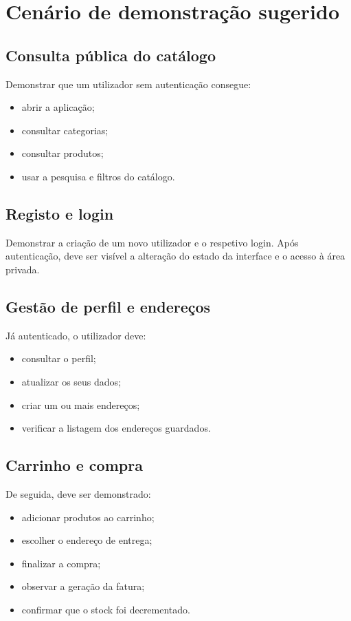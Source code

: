 \documentclass[10pt,a4paper]{report}
\begin{document}
\section{Cenário de demonstração sugerido}

\subsection{Consulta pública do catálogo}

Demonstrar que um utilizador sem autenticação consegue:

\begin{itemize}
    \item abrir a aplicação;
    \item consultar categorias;
    \item consultar produtos;
    \item usar a pesquisa e filtros do catálogo.
\end{itemize}

\subsection{Registo e login}

Demonstrar a criação de um novo utilizador e o respetivo login. Após autenticação, deve ser visível a alteração do estado da interface e o acesso à área privada.

\subsection{Gestão de perfil e endereços}

Já autenticado, o utilizador deve:

\begin{itemize}
    \item consultar o perfil;
    \item atualizar os seus dados;
    \item criar um ou mais endereços;
    \item verificar a listagem dos endereços guardados.
\end{itemize}

\subsection{Carrinho e compra}

De seguida, deve ser demonstrado:

\begin{itemize}
    \item adicionar produtos ao carrinho;
    \item escolher o endereço de entrega;
    \item finalizar a compra;
    \item observar a geração da fatura;
    \item confirmar que o stock foi decrementado.
\end{itemize}
\end{document}
